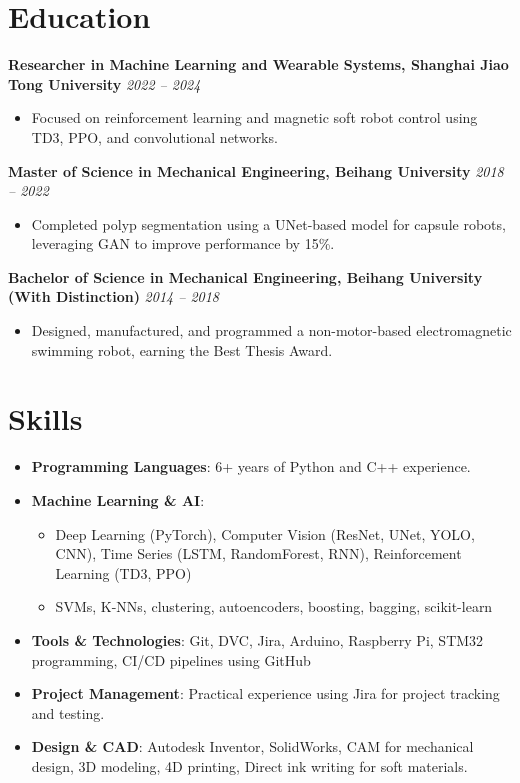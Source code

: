 \documentclass[10pt,a4paper]{article}
\begin{document}
	\section{Education}
	\textbf{Researcher in Machine Learning and Wearable Systems, Shanghai Jiao Tong University} \hfill \textit{2022 -- 2024} \\
	\begin{itemize}[left=0pt, nosep]
		\item Focused on reinforcement learning and magnetic soft robot control using TD3, PPO, and convolutional networks.
	\end{itemize}
	
	\textbf{Master of Science in Mechanical Engineering, Beihang University} \hfill \textit{2018 -- 2022} \\
	\begin{itemize}[left=0pt, nosep]
		\item Completed polyp segmentation using a UNet-based model for capsule robots, leveraging GAN to improve performance by 15\%.
	\end{itemize}
	
	\textbf{Bachelor of Science in Mechanical Engineering, Beihang University (With Distinction)} \hfill \textit{2014 -- 2018} \\
	\begin{itemize}[left=0pt, nosep]
		\item Designed, manufactured, and programmed a non-motor-based electromagnetic swimming robot, earning the Best Thesis Award.
	\end{itemize}
	
	\section{Skills}
	\begin{itemize}[left=0pt, nosep]
		\item \textbf{Programming Languages}: 6+ years of Python and C++ experience.
		\item \textbf{Machine Learning \& AI}:
		\begin{itemize}[left=0pt, nosep]
			\item Deep Learning (PyTorch), Computer Vision (ResNet, UNet, YOLO, CNN), Time Series (LSTM, RandomForest, RNN), Reinforcement Learning (TD3, PPO)
			\item SVMs, K-NNs, clustering, autoencoders, boosting, bagging, scikit-learn
		\end{itemize}
		\item \textbf{Tools \& Technologies}: Git, DVC, Jira, Arduino, Raspberry Pi, STM32 programming, CI/CD pipelines using GitHub
		\item \textbf{Project Management}: Practical experience using Jira for project tracking and testing.
		\item \textbf{Design \& CAD}: Autodesk Inventor, SolidWorks, CAM for mechanical design, 3D modeling, 4D printing, Direct ink writing for soft materials.
	\end{itemize}
	
\end{document}

